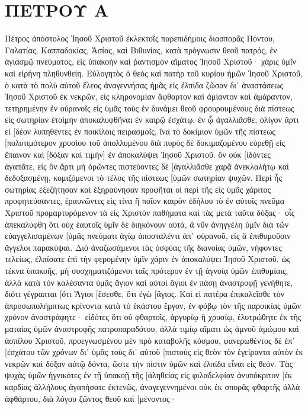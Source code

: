 \section{ΠΕΤΡΟΥ Α}
Πέτρος ἀπόστολος Ἰησοῦ Χριστοῦ ἐκλεκτοῖς παρεπιδήμοις διασπορᾶς Πόντου, Γαλατίας, Καππαδοκίας, Ἀσίας, καὶ Βιθυνίας, 
κατὰ πρόγνωσιν θεοῦ πατρός, ἐν ἁγιασμῷ πνεύματος, εἰς ὑπακοὴν καὶ ῥαντισμὸν αἵματος Ἰησοῦ Χριστοῦ· χάρις ὑμῖν καὶ εἰρήνη πληθυνθείη. 
Εὐλογητὸς ὁ θεὸς καὶ πατὴρ τοῦ κυρίου ἡμῶν Ἰησοῦ Χριστοῦ, ὁ κατὰ τὸ πολὺ αὐτοῦ ἔλεος ἀναγεννήσας ἡμᾶς εἰς ἐλπίδα ζῶσαν δι᾽ ἀναστάσεως Ἰησοῦ Χριστοῦ ἐκ νεκρῶν, 
εἰς κληρονομίαν ἄφθαρτον καὶ ἀμίαντον καὶ ἀμάραντον, τετηρημένην ἐν οὐρανοῖς εἰς ὑμᾶς 
τοὺς ἐν δυνάμει θεοῦ φρουρουμένους διὰ πίστεως εἰς σωτηρίαν ἑτοίμην ἀποκαλυφθῆναι ἐν καιρῷ ἐσχάτῳ. 
ἐν ᾧ ἀγαλλιᾶσθε, ὀλίγον ἄρτι εἰ [δέον λυπηθέντες ἐν ποικίλοις πειρασμοῖς, 
ἵνα τὸ δοκίμιον ὑμῶν τῆς πίστεως [πολυτιμότερον χρυσίου τοῦ ἀπολλυμένου διὰ πυρὸς δὲ δοκιμαζομένου εὑρεθῇ εἰς ἔπαινον καὶ [δόξαν καὶ τιμὴν] ἐν ἀποκαλύψει Ἰησοῦ Χριστοῦ. 
ὃν οὐκ [ἰδόντες ἀγαπᾶτε, εἰς ὃν ἄρτι μὴ ὁρῶντες πιστεύοντες δὲ [ἀγαλλιᾶσθε χαρᾷ ἀνεκλαλήτῳ καὶ δεδοξασμένῃ, 
κομιζόμενοι τὸ τέλος τῆς πίστεως [ὑμῶν σωτηρίαν ψυχῶν. 
Περὶ ἧς σωτηρίας ἐξεζήτησαν καὶ ἐξηραύνησαν προφῆται οἱ περὶ τῆς εἰς ὑμᾶς χάριτος προφητεύσαντες, 
ἐραυνῶντες εἰς τίνα ἢ ποῖον καιρὸν ἐδήλου τὸ ἐν αὐτοῖς πνεῦμα Χριστοῦ προμαρτυρόμενον τὰ εἰς Χριστὸν παθήματα καὶ τὰς μετὰ ταῦτα δόξας· 
οἷς ἀπεκαλύφθη ὅτι οὐχ ἑαυτοῖς ὑμῖν δὲ διηκόνουν αὐτά, ἃ νῦν ἀνηγγέλη ὑμῖν διὰ τῶν εὐαγγελισαμένων [ὑμᾶς πνεύματι ἁγίῳ ἀποσταλέντι ἀπ᾽ οὐρανοῦ, εἰς ἃ ἐπιθυμοῦσιν ἄγγελοι παρακύψαι. 
Διὸ ἀναζωσάμενοι τὰς ὀσφύας τῆς διανοίας ὑμῶν, νήφοντες τελείως, ἐλπίσατε ἐπὶ τὴν φερομένην ὑμῖν χάριν ἐν ἀποκαλύψει Ἰησοῦ Χριστοῦ. 
ὡς τέκνα ὑπακοῆς, μὴ συσχηματιζόμενοι ταῖς πρότερον ἐν τῇ ἀγνοίᾳ ὑμῶν ἐπιθυμίαις, 
ἀλλὰ κατὰ τὸν καλέσαντα ὑμᾶς ἅγιον καὶ αὐτοὶ ἅγιοι ἐν πάσῃ ἀναστροφῇ γενήθητε, 
διότι γέγραπται [ὅτι Ἅγιοι [ἔσεσθε, ὅτι ἐγὼ [ἅγιος. 
Καὶ εἰ πατέρα ἐπικαλεῖσθε τὸν ἀπροσωπολήμπτως κρίνοντα κατὰ τὸ ἑκάστου ἔργον, ἐν φόβῳ τὸν τῆς παροικίας ὑμῶν χρόνον ἀναστράφητε· 
εἰδότες ὅτι οὐ φθαρτοῖς, ἀργυρίῳ ἢ χρυσίῳ, ἐλυτρώθητε ἐκ τῆς ματαίας ὑμῶν ἀναστροφῆς πατροπαραδότου, 
ἀλλὰ τιμίῳ αἵματι ὡς ἀμνοῦ ἀμώμου καὶ ἀσπίλου Χριστοῦ, 
προεγνωσμένου μὲν πρὸ καταβολῆς κόσμου, φανερωθέντος δὲ ἐπ᾽ [ἐσχάτου τῶν χρόνων δι᾽ ὑμᾶς 
τοὺς δι᾽ αὐτοῦ [πιστοὺς εἰς θεὸν τὸν ἐγείραντα αὐτὸν ἐκ νεκρῶν καὶ δόξαν αὐτῷ δόντα, ὥστε τὴν πίστιν ὑμῶν καὶ ἐλπίδα εἶναι εἰς θεόν. 
Τὰς ψυχὰς ὑμῶν ἡγνικότες ἐν τῇ ὑπακοῇ τῆς [ἀληθείας εἰς φιλαδελφίαν ἀνυπόκριτον [ἐκ καρδίας ἀλλήλους ἀγαπήσατε ἐκτενῶς, 
ἀναγεγεννημένοι οὐκ ἐκ σπορᾶς φθαρτῆς ἀλλὰ ἀφθάρτου, διὰ λόγου ζῶντος θεοῦ καὶ [μένοντος· 

